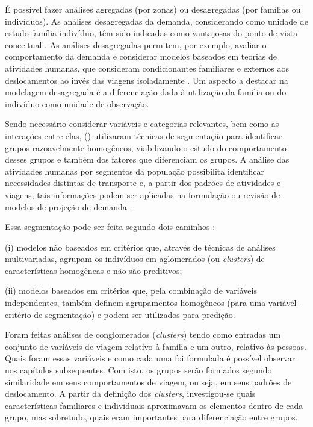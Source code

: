 É possível fazer análises agregadas (por zonas) ou desagregadas (por famílias ou indivíduos).
As análises desagregadas da demanda, considerando como unidade de estudo família indivíduo, têm sido indicadas como vantajosas do ponto de vista conceitual \cite{ORTUZAR1994}. As análises desagregadas permitem, por exemplo, avaliar o comportamento da demanda e considerar modelos baseados em teorias de atividades humanas, que consideram condicionantes familiares e externos aos deslocamentos ao invés das viagens isoladamente \cite{JONES1981}.
Um aspecto a destacar na modelagem desagregada é a diferenciação dada à utilização da família ou do indivíduo como unidade de observação.

Sendo necessário considerar variáveis e categorias relevantes, bem como as interações entre elas,  (\citeyear{STRAMBI1998}) utilizaram técnicas de segmentação para identificar grupos razoavelmente homogêneos, viabilizando o estudo do comportamento desses grupos e também dos fatores que diferenciam os grupos.
A análise das atividades humanas por segmentos da população possibilita identificar necessidades distintas de transporte e, a partir dos padrões de atividades e viagens, tais informações podem ser aplicadas na formulação ou revisão de modelos de projeção de demanda \cite{MAHMASSANI1988}.

Essa segmentação pode ser feita segundo dois caminhos \cite{MAGIDSON1994}:
\begin{compactitem}[]
\item (i) modelos não baseados em critérios que, através de técnicas de análises multivariadas, agrupam os indivíduos em aglomerados (ou \textit{clusters}) de características homogêneas e não são preditivos;
\item (ii) modelos baseados em critérios que, pela combinação de variáveis independentes, também definem agrupamentos homogêneos (para uma variável-critério de segmentação) e podem ser utilizados para predição.
\end{compactitem}

Foram feitas análises de conglomerados (\textit{clusters}) tendo como entradas um conjunto de variáveis de viagem relativo à família e um outro, relativo às pessoas. Quais foram essas variáveis e como cada uma foi formulada é possível observar nos capítulos subsequentes. Com isto, os grupos serão formados segundo similaridade em seus comportamentos de viagem, ou seja, em seus padrões de deslocamento. A partir da definição dos \textit{clusters}, investigou-se quais características familiares e individuais aproximavam os elementos dentro de cada grupo, mas sobretudo, quais eram importantes para diferenciação entre grupos.

